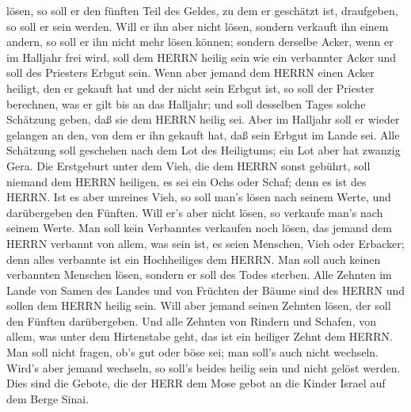 lösen, so soll er den fünften Teil des Geldes, zu dem er geschätzt ist,
draufgeben, so soll er sein werden.  Will er ihn aber nicht
lösen, sondern verkauft ihn einem andern, so soll er ihn nicht mehr
lösen können;  sondern derselbe Acker, wenn er im Halljahr
frei wird, soll dem HERRN heilig sein wie ein verbannter Acker und soll
des Priesters Erbgut sein.  Wenn aber jemand dem HERRN
einen Acker heiligt, den er gekauft hat und der nicht sein Erbgut ist,
 so soll der Priester berechnen, was er gilt bis an das
Halljahr; und soll desselben Tages solche Schätzung geben, daß sie dem
HERRN heilig sei.  Aber im Halljahr soll er wieder gelangen
an den, von dem er ihn gekauft hat, daß sein Erbgut im Lande sei.
 Alle Schätzung soll geschehen nach dem Lot des Heiligtums;
ein Lot aber hat zwanzig Gera.  Die Erstgeburt unter dem
Vieh, die dem HERRN sonst gebührt, soll niemand dem HERRN heiligen, es
sei ein Ochs oder Schaf; denn es ist des HERRN.  Ist es
aber unreines Vieh, so soll man's lösen nach seinem Werte, und
darübergeben den Fünften. Will er's aber nicht lösen, so verkaufe man's
nach seinem Werte.  Man soll kein Verbanntes verkaufen noch
lösen, das jemand dem HERRN verbannt von allem, was sein ist, es seien
Menschen, Vieh oder Erbacker; denn alles verbannte ist ein Hochheiliges
dem HERRN.  Man soll auch keinen verbannten Menschen lösen,
sondern er soll des Todes sterben.  Alle Zehnten im Lande
von Samen des Landes und von Früchten der Bäume sind des HERRN und
sollen dem HERRN heilig sein.  Will aber jemand seinen
Zehnten lösen, der soll den Fünften darübergeben.  Und alle
Zehnten von Rindern und Schafen, von allem, was unter dem Hirtenstabe
geht, das ist ein heiliger Zehnt dem HERRN.  Man soll nicht
fragen, ob's gut oder böse sei; man soll's auch nicht wechseln. Wird's
aber jemand wechseln, so soll's beides heilig sein und nicht gelöst
werden.  Dies sind die Gebote, die der HERR dem Mose gebot
an die Kinder Israel auf dem Berge Sinai.
